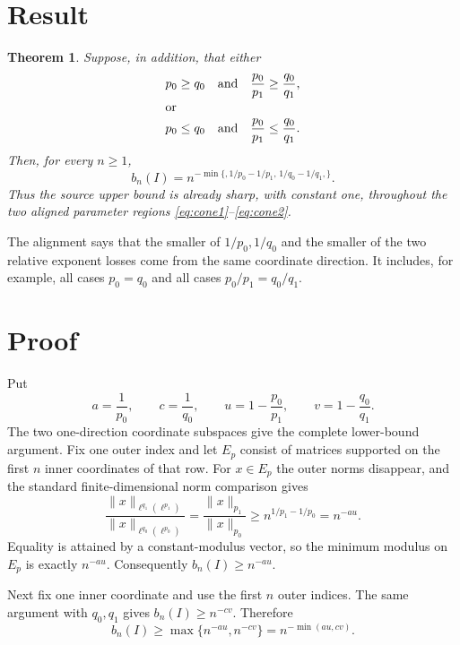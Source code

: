 \documentclass[11pt]{article}
\newtheorem{theorem}{Theorem}
\newcommand{\ellp}[1]{\ell^{#1}}
\begin{document}
\section*{Result}

\begin{theorem}\label{thm:main}
Suppose, in addition, that either
\begin{align}
 &p_0\ge q_0 \quad\text{and}\quad
   \frac{p_0}{p_1}\ge\frac{q_0}{q_1}, \label{eq:cone1}\\
 \intertext{or}
 &p_0\le q_0 \quad\text{and}\quad
   \frac{p_0}{p_1}\le\frac{q_0}{q_1}. \label{eq:cone2}
\end{align}
Then, for every $n\ge1$,
\begin{equation}\label{eq:exact}
 \boxed{\quad
 b_n(I)=n^{-\min\{,1/p_0-1/p_1,\,
                         1/q_0-1/q_1,\}}.
 \quad}
\end{equation}
Thus the source upper bound is already sharp, with constant one, throughout
the two aligned parameter regions \eqref{eq:cone1}--\eqref{eq:cone2}.
\end{theorem}

The alignment says that the smaller of $1/p_0,1/q_0$ and the smaller of
the two relative exponent losses come from the same coordinate direction.
It includes, for example, all cases $p_0=q_0$ and all cases
$p_0/p_1=q_0/q_1$.

\section*{Proof}

Put
\[
 a=\frac1{p_0},\qquad c=\frac1{q_0},\qquad
 u=1-\frac{p_0}{p_1},\qquad
 v=1-\frac{q_0}{q_1}.
\]
The two one-direction coordinate subspaces give the complete lower-bound
argument.  Fix one outer index and let $E_p$ consist of matrices supported
on the first $n$ inner coordinates of that row.  For $x\in E_p$ the outer
norms disappear, and the standard finite-dimensional norm comparison gives
\[
 \frac{\lVert x\rVert_{\ellp{q_1}(\ellp{p_1})}}
      {\lVert x\rVert_{\ellp{q_0}(\ellp{p_0})}}
 =\frac{\lVert x\rVert_{p_1}}{\lVert x\rVert_{p_0}}
 \ge n^{1/p_1-1/p_0}=n^{-au}.
\]
Equality is attained by a constant-modulus vector, so the minimum modulus
on $E_p$ is exactly $n^{-au}$.  Consequently $b_n(I)\ge n^{-au}$.

Next fix one inner coordinate and use the first $n$ outer indices.  The
same argument with $q_0,q_1$ gives $b_n(I)\ge n^{-cv}$.  Therefore
\begin{equation}\label{eq:lower}
 b_n(I)\ge \max\{n^{-au},n^{-cv}\}
          =n^{-\min(au,cv)}.
\end{equation}
\end{document}
